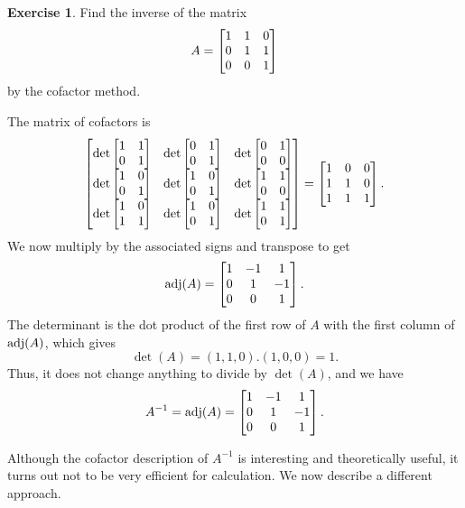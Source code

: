 \documentclass[a4paper]{book}
\theoremstyle{definition}
\newtheorem{exercise}[theorem]{Exercise}
\renewenvironment{solution}{\SolutionInline}{\endSolutionInline}
\begin{document}
\begin{exercise}
 Find the inverse of the matrix
 \[ A = \begin{bmatrix} 1&1&0\\ 0&1&1\\  0&0&1 \end{bmatrix} \]
 by the cofactor method.
\end{exercise}
\begin{solution}
 The matrix of cofactors is
 \[ \begin{bmatrix} 
     \det\begin{bmatrix} 1&1\\ 0&1\end{bmatrix} &
     \det\begin{bmatrix} 0&1\\ 0&1\end{bmatrix} &
     \det\begin{bmatrix} 0&1\\ 0&0\end{bmatrix} \\
     \det\begin{bmatrix} 1&0\\ 0&1\end{bmatrix} &
     \det\begin{bmatrix} 1&0\\ 0&1\end{bmatrix} &
     \det\begin{bmatrix} 1&1\\ 0&0\end{bmatrix} \\
     \det\begin{bmatrix} 1&0\\ 1&1\end{bmatrix} &
     \det\begin{bmatrix} 1&0\\ 0&1\end{bmatrix} &
     \det\begin{bmatrix} 1&1\\ 0&1\end{bmatrix} 
    \end{bmatrix} = 
    \begin{bmatrix} 1 & 0 & 0 \\
         1 & 1 & 0 \\ 
         1 & 1 & 1 \end{bmatrix}.
 \]
 We now multiply by the associated signs and transpose to get
 \[ \operatorname{adj}(A) = \begin{bmatrix} 1&-1&1 \\ 0&1&-1\\ 0&0&1 \end{bmatrix}. \]
 The determinant is the dot product of the first row of $A$ with the
 first column of $\operatorname{adj}(A)$, which gives
 \[ \det(A) = (1,1,0).(1,0,0) = 1. \] 
 Thus, it does not change anything to divide by $\det(A)$, and we have
 \[ A^{-1} = \operatorname{adj}(A) = \begin{bmatrix} 1&-1&1 \\ 0&1&-1\\ 0&0&1 \end{bmatrix}. \]
\end{solution}


Although the cofactor description of $A^{-1}$ is interesting and
theoretically useful, it turns out not to be very efficient for
calculation.  We now describe a different approach.
\end{document}
